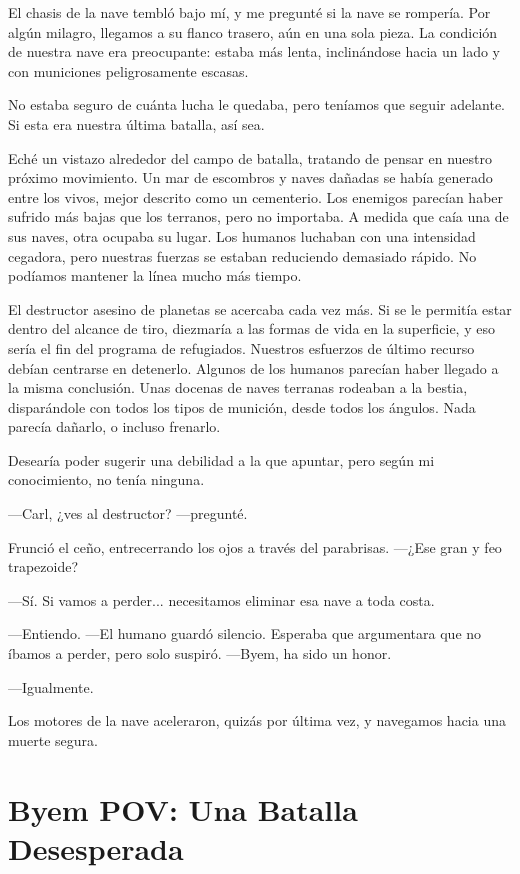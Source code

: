 \documentclass[spanish,12pt,a4paper,oneside,titlepage]{book}
\begin{document}
    El chasis de la nave tembló bajo mí, y me pregunté si la nave se rompería. Por algún milagro, llegamos a su flanco trasero, aún en una sola pieza. La condición de nuestra nave era preocupante: estaba más lenta, inclinándose hacia un lado y con municiones peligrosamente escasas.

    No estaba seguro de cuánta lucha le quedaba, pero teníamos que seguir adelante. Si esta era nuestra última batalla, así sea.

    Eché un vistazo alrededor del campo de batalla, tratando de pensar en nuestro próximo movimiento. Un mar de escombros y naves dañadas se había generado entre los vivos, mejor descrito como un cementerio. Los enemigos parecían haber sufrido más bajas que los terranos, pero no importaba. A medida que caía una de sus naves, otra ocupaba su lugar. Los humanos luchaban con una intensidad cegadora, pero nuestras fuerzas se estaban reduciendo demasiado rápido. No podíamos mantener la línea mucho más tiempo.

    El destructor asesino de planetas se acercaba cada vez más. Si se le permitía estar dentro del alcance de tiro, diezmaría a las formas de vida en la superficie, y eso sería el fin del programa de refugiados. Nuestros esfuerzos de último recurso debían centrarse en detenerlo. Algunos de los humanos parecían haber llegado a la misma conclusión. Unas docenas de naves terranas rodeaban a la bestia, disparándole con todos los tipos de munición, desde todos los ángulos. Nada parecía dañarlo, o incluso frenarlo.

    Desearía poder sugerir una debilidad a la que apuntar, pero según mi conocimiento, no tenía ninguna.

    —Carl, ¿ves al destructor? —pregunté.

    Frunció el ceño, entrecerrando los ojos a través del parabrisas. —¿Ese gran y feo trapezoide?

    —Sí. Si vamos a perder... necesitamos eliminar esa nave a toda costa.

    —Entiendo. —El humano guardó silencio. Esperaba que argumentara que no íbamos a perder, pero solo suspiró. —Byem, ha sido un honor.

    —Igualmente.

    Los motores de la nave aceleraron, quizás por última vez, y navegamos hacia una muerte segura.

    \chapter{Byem POV: Una Batalla Desesperada}\label{Byem_POV_Una_Batalla_Desesperada}
\end{document}
